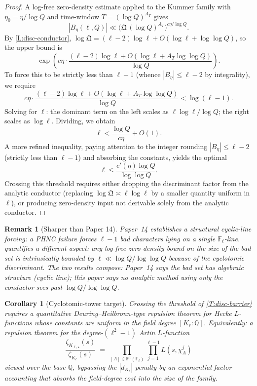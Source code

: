 \documentclass[11pt]{article}
\newtheorem{corollary}{Corollary}
\newtheorem{remark}{Remark}
\newcommand{\Q}{\mathbb Q}
\newcommand{\F}{\mathbb F}
\newcommand{\Pj}{\mathbb P}
\newcommand{\1}{\mathbf 1}
\begin{document}
\begin{proof}
A log-free zero-density estimate applied to the Kummer family with \(\eta_0=\eta/\log Q\) and time-window \(T=(\log Q)^{A_T}\) gives
\[
|B_\eta(\ell,Q)|\ll\bigl(\mathfrak Q\,(\log Q)^{A_T}\bigr)^{c\eta/\log Q}.
\]
By \cref{L:disc-conductor}, \(\log\mathfrak Q=(\ell-2)\log\ell+O(\log\ell+\log\log Q)\), so the upper bound is
\[
\exp\!\left(c\eta\cdot\frac{(\ell-2)\log\ell+O(\log\ell+A_T\log\log Q)}{\log Q}\right).
\]
To force this to be strictly less than \(\ell-1\) (whence \(|B_\eta|\le\ell-2\) by integrality), we require
\[
c\eta\cdot\frac{(\ell-2)\log\ell+O(\log\ell+A_T\log\log Q)}{\log Q}<\log(\ell-1).
\]
Solving for \(\ell\): the dominant term on the left scales as \(\ell\log\ell/\log Q\); the right scales as \(\log\ell\).  Dividing, we obtain
\[
\ell<\frac{\log Q}{c\eta}+O(1).
\]
A more refined inequality, paying attention to the integer rounding \(|B_\eta|\le\ell-2\) (strictly less than \(\ell-1\)) and absorbing the constants, yields the optimal
\[
\ell\le\frac{c'(\eta)\log Q}{\log\log Q}.
\]
Crossing this threshold requires either dropping the discriminant factor from the analytic conductor (replacing \(\log\mathfrak Q\asymp\ell\log\ell\) by a smaller quantity uniform in \(\ell\)), or producing zero-density input not derivable solely from the analytic conductor.
\end{proof}

\begin{remark}[Sharper than Paper 14]
Paper~14 establishes a structural cyclic-line forcing: a PHNC failure forces \(\ell-1\) bad characters lying on a single \(\F_\ell\)-line.   quantifies a different aspect: any log-free-zero-density bound on the size of the bad set is intrinsically bounded by \(\ell\ll\log Q/\log\log Q\) because of the cyclotomic discriminant.  The two results compose: Paper~14 says the bad set has algebraic structure (cyclic line); this paper says no analytic method using only the conductor sees past \(\log Q/\log\log Q\).
\end{remark}

\begin{corollary}[Cyclotomic-tower target]\label{C:tower-target}
Crossing the threshold of \cref{T:disc-barrier} requires a quantitative Deuring--Heilbronn-type repulsion theorem for Hecke \(L\)-functions whose constants are uniform in the field degree \([K_\ell:\Q]\).  Equivalently: a repulsion theorem for the degree-\((\ell^2-1)\) Artin \(L\)-function
\[
\frac{\zeta_{K_{\ell,\star}}(s)}{\zeta_{K_\ell}(s)}\;=\;\prod_{[A]\in\Pj^1(\F_\ell)}\prod_{j=1}^{\ell-1}L(s,\chi_A^j)
\]
viewed over the base \(\Q\), bypassing the \(|d_{K_\ell}|\) penalty by an exponential-factor accounting that absorbs the field-degree cost into the size of the family.
\end{corollary}
\end{document}
